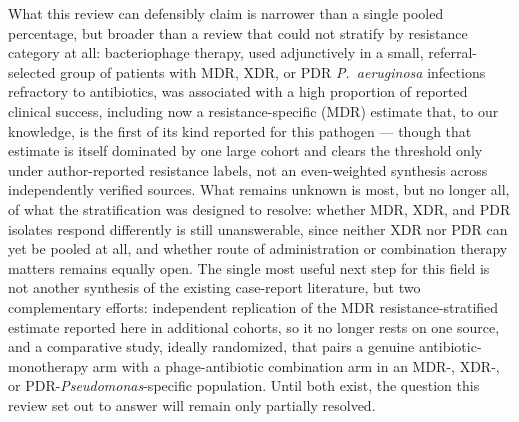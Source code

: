 What this review can defensibly claim is narrower than a single pooled percentage, but broader than a review that could not stratify by resistance category at all: bacteriophage therapy, used adjunctively in a small, referral-selected group of patients with MDR, XDR, or PDR \textit{P.\ aeruginosa} infections refractory to antibiotics, was associated with a high proportion of reported clinical success, including now a resistance-specific (MDR) estimate that, to our knowledge, is the first of its kind reported for this pathogen --- though that estimate is itself dominated by one large cohort and clears the threshold only under author-reported resistance labels, not an even-weighted synthesis across independently verified sources. What remains unknown is most, but no longer all, of what the stratification was designed to resolve: whether MDR, XDR, and PDR isolates respond differently is still unanswerable, since neither XDR nor PDR can yet be pooled at all, and whether route of administration or combination therapy matters remains equally open. The single most useful next step for this field is not another synthesis of the existing case-report literature, but two complementary efforts: independent replication of the MDR resistance-stratified estimate reported here in additional cohorts, so it no longer rests on one source, and a comparative study, ideally randomized, that pairs a genuine antibiotic-monotherapy arm with a phage-antibiotic combination arm in an MDR-, XDR-, or PDR-\textit{Pseudomonas}-specific population. Until both exist, the question this review set out to answer will remain only partially resolved.

